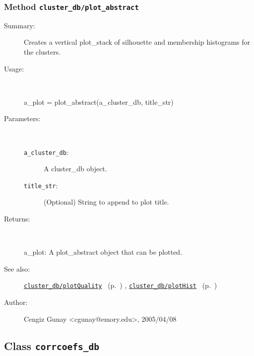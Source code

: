 \subsubsection[Method \texttt{plot\_abstract}]{Method \texttt{cluster\_db/plot\_abstract}}%
%
\label{ref_cluster_db__plot_abstract}%
\hypertarget{ref_cluster_db__plot_abstract}{}%
\begin{description}
\item[Summary:]Creates a vertical plot\_stack of silhouette and membership histograms for the clusters.
%
\item[Usage:]~%
\begin{lyxcode}%
a\_plot = plot\_abstract(a\_cluster\_db, title\_str)
%
\end{lyxcode}%
%
%
\item[Parameters:]~
\begin{description}%
\item[\texttt{a\_cluster\_db}:]
 A cluster\_db object.
\item[\texttt{title\_str}:]
 (Optional) String to append to plot title.
\end{description}%
%
\item[Returns:]~

	a\_plot: A plot\_abstract object that can be plotted.
%
%
\item[See also:]%
\hyperlink{ref_cluster_db__plotQuality}{\texttt{cluster\_db/plotQuality}}%
\ (p.~\pageref{ref_cluster_db__plotQuality})%
%
, \hyperlink{ref_cluster_db__plotHist}{\texttt{cluster\_db/plotHist}}%
\ (p.~\pageref{ref_cluster_db__plotHist})%
%
%
\item[Author:]%
Cengiz Gunay <cgunay@emory.edu>, 2005/04/08%
\end{description}
\methodline%
\subsection{Class \texttt{corrcoefs\_db}}%
%
\label{ref_corrcoefs_db}%
\hypertarget{ref_corrcoefs_db}{}%
